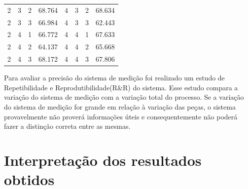 \documentclass[
12pt,					%
openright,				%
oneside,				%
a4paper,				%
english,
brazil
]{ABNT/abntex2_report}
\begin{document}
\begin{table}[H]
\begin{tabular}{llllllll}
	2                           & 3                        & 2                         & 68.764   & 4                           & 3                        & 2                         & 68.634                        \\
	2                           & 3                        & 3                         & 66.984   & 4                           & 3                        & 3                         & 62.443                        \\
	2                           & 4                        & 1                         & 66.772   & 4                           & 4                        & 1                         & 67.633                        \\
	2                           & 4                        & 2                         & 64.137   & 4                           & 4                        & 2                         & 65.668                        \\
	2                           & 4                        & 3                         & 68.172   & 4                           & 4                        & 3                         & 67.806                       
	\end{tabular}
	\label{tab:dados}
	\end{table}

Para avaliar a precisão do  sistema de medição foi realizado um estudo de Repetibilidade e Reprodutibilidade(R\&R) do sistema. Esse estudo compara a variação do sistema de medição com a variação total do processo. Se a variação do sistema de medição for grande em relação à variação das peças, o sistema provavelmente não proverá informações úteis e consequentemente não poderá fazer a distinção correta entre as mesmas.
\newpage
\section*{Interpretação dos resultados obtidos}
\end{document}
